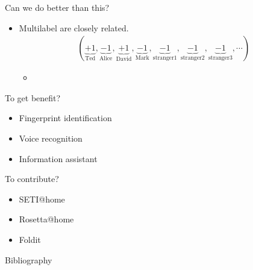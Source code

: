 \documentclass[first=dgreen,second=purple,logo=yellowexc]{aaltoslides}
\begin{document}
{\begin{frame}{Can we do better than this?}
	\begin{itemize}
		\item Multilabel are closely related.
		\begin{align*}
(\underbrace{+1}_{\text{Ted}},\underbrace{-1}_{\text{Alice}},\underbrace{+1}_{\text{David}},\underbrace{-1}_{\text{Mark}},\underbrace{-1}_{\text{stranger1}},\underbrace{-1}_{\text{stranger2}},\underbrace{-1}_{\text{stranger3}}, \cdots)
		\end{align*}
		\begin{itemize}
			\footnotesize
			\item 
		\end{itemize}
		
	\end{itemize}
\end{frame}



\begin{frame}{To get benefit?}
	\begin{itemize}
		\item Fingerprint identification
		\item Voice recognition
		\item Information assistant
	\end{itemize}
\end{frame}


\begin{frame}{To contribute?}
	\begin{itemize}
		\item SETI@home
		\item Rosetta@home
		\item Foldit
	\end{itemize}
\end{frame}










\begin{frame}[allowframebreaks]{Bibliography}
%

 
\end{frame}

}
\end{document}
